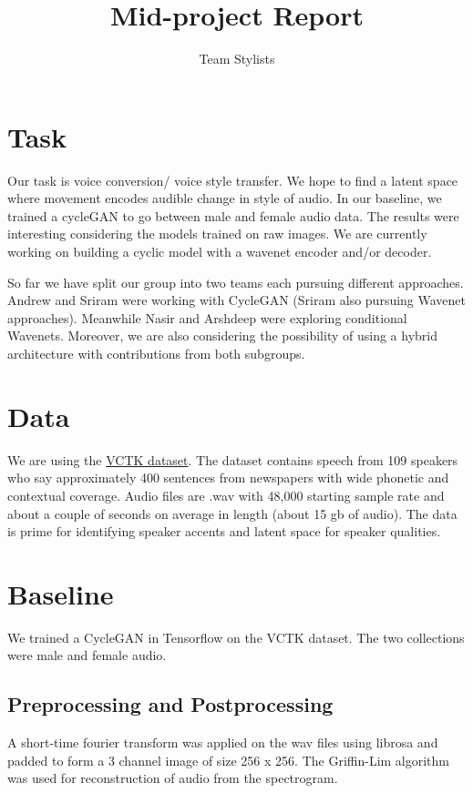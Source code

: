 \documentclass[a4paper]{article}
\title{Mid-project Report}
\author{Team Stylists}
\begin{document}
\maketitle

\section{Task}
Our task is voice conversion/ voice style transfer. We hope to find a latent space where movement encodes audible change in style of audio. In our baseline, we trained a cycleGAN to go between male and female audio data. The results were interesting considering the models trained on raw images. We are currently working on building a cyclic model with a wavenet encoder and/or decoder.

So far we have split our group into two teams each pursuing different approaches. Andrew and Sriram were working with CycleGAN (Sriram also pursuing Wavenet approaches). Meanwhile Nasir and Arshdeep were exploring conditional Wavenets. Moreover, we are also considering the possibility of using a hybrid architecture with contributions from both subgroups.

\section{Data}
We are using the \href{http://homepages.inf.ed.ac.uk/jyamagis/page3/page58/page58.html}{VCTK dataset}. The dataset contains speech from 109 speakers who say approximately 400 sentences from newspapers with wide phonetic and contextual coverage. Audio files are .wav with 48,000 starting sample rate and about a couple of seconds on average in length (about 15 gb of audio). The data is prime for identifying speaker accents and latent space for speaker qualities.

\section{Baseline}
We trained a CycleGAN in Tensorflow on the VCTK dataset. The two collections were male and female audio.
\subsection{Preprocessing and Postprocessing}
A short-time fourier transform was applied on the wav files using librosa and padded to form a 3 channel image of size 256 x 256. The Griffin-Lim algorithm was used for reconstruction of audio from the spectrogram.
\end{document}
